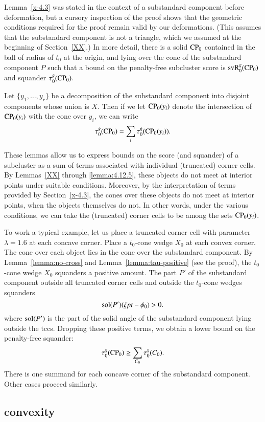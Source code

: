 Lemma~\ref{x-4.3} was stated in the context of a substandard component before
deformation, but a cursory inspection of the proof shows that the
geometric conditions required for the proof remain valid by our
deformations. (This assumes that the substandard component is not a triangle, which
we assumed at the beginning of Section~\ref{XX}.) In more detail,
there is a solid ${\operatorname{CP}}_0$ contained in the ball of radius of $t_0$ at the
origin, and lying over the cone of the substandard component $P$ such that a bound
on the penalty-free subcluster score is 
${\operatorname{svR}}^g_0({\operatorname{CP}}_0)$ and squander $\tau^g_0({\operatorname{CP}}_0)$.

Let $\{y_1,\ldots,y_r\}$ be a decomposition of the substandard component into
disjoint components whose union is $X$. Then if we let ${\operatorname{CP}}_0(y_i)$ denote
the intersection of ${\operatorname{CP}}_0(y_i)$ with the cone over $y_i$, we can write
    $$\tau^g_0({\operatorname{CP}}_0) =\sum_i \tau^g_0({\operatorname{CP}}_0(y_i)).$$

These lemmas allow us to express bounds on the score (and
squander) of a subcluster as a sum of terms associated with
individual (truncated) corner cells. By Lemmas~\ref{XX} %
through \ref{lemma:4.12.5}, these objects do not meet at interior
points under suitable conditions. Moreover, by the interpretation
of terms provided by Section~\ref{x-4.3}, the cones over these
objects do not meet at interior points, when the objects
themselves do not. In other words, under the various conditions,
we can take the (truncated) corner cells to be among the sets
${\operatorname{CP}}_0(y_i)$.

To work a typical example, let us place a truncated corner cell with
parameter $\lambda=1.6$ at each concave corner.  Place a $t_0$-cone
wedge $X_0$ at each convex corner. The cone over each object lies in the
cone over the substandard component. By Lemma~\ref{lemma:no-cross} and
Lemma~\ref{lemma:tau-positive} (see the proof), the $t_0$-cone wedge
$X_0$ squanders a positive amount.  The part $P'$ of the substandard component
outside all truncated corner cells and outside the $t_0$-cone wedges
squanders
    $$\operatorname{sol}(P')(\zeta\hbox{\it pt}-\phi_0) > 0.$$
where $\operatorname{sol}(P')$ is the part of the solid angle of the substandard component
lying outside the tccs. Dropping these positive terms, we obtain a
lower bound on the penalty-free squander:
    $$\tau^g_0({\operatorname{CP}}_0) \ge \sum_{C_0} \tau^g_0(C_0).$$
There is one summand for each concave corner of the substandard component.
Other cases proceed similarly.


\subsection{convexity} %

